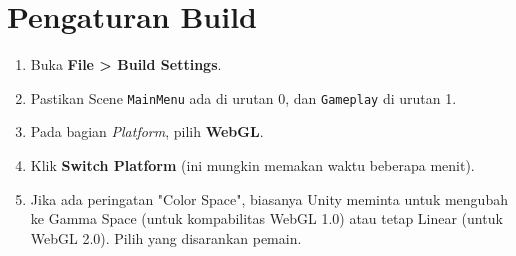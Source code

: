 
\section{Pengaturan Build}

\begin{enumerate}
    \item Buka \textbf{File > Build Settings}.
    \item Pastikan Scene \texttt{MainMenu} ada di urutan 0, dan \texttt{Gameplay} di urutan 1.
    \item Pada bagian \textit{Platform}, pilih \textbf{WebGL}.
    \item Klik \textbf{Switch Platform} (ini mungkin memakan waktu beberapa menit).
    \item Jika ada peringatan "Color Space", biasanya Unity meminta untuk mengubah ke Gamma Space (untuk kompabilitas WebGL 1.0) atau tetap Linear (untuk WebGL 2.0). Pilih yang disarankan pemain.
\end{enumerate}
